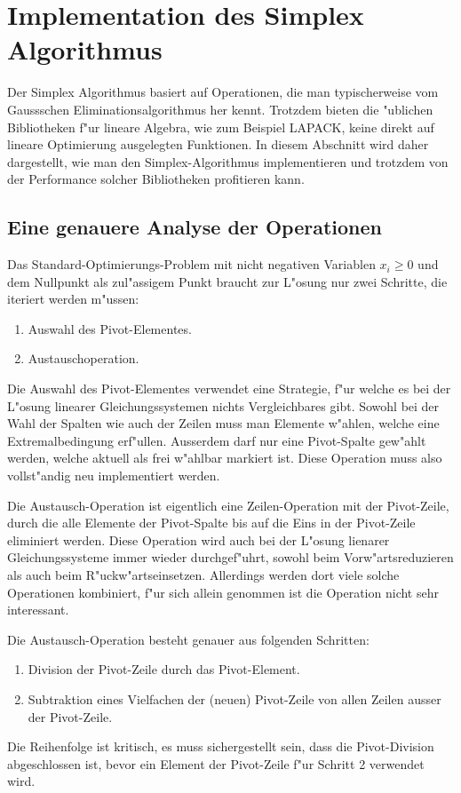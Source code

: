 \chapter{Implementation des Simplex Algorithmus}

Der Simplex Algorithmus basiert auf Operationen, die man typischerweise
vom Gaussschen Eliminationsalgorithmus her kennt.
Trotzdem bieten die "ublichen Bibliotheken f"ur lineare Algebra,
wie zum Beispiel LAPACK, keine direkt auf lineare Optimierung
ausgelegten Funktionen.
In diesem Abschnitt wird daher dargestellt, wie man den Simplex-Algorithmus
implementieren und trotzdem von der Performance solcher
Bibliotheken profitieren kann.

\section{Eine genauere Analyse der Operationen}
Das Standard-Optimierungs-Problem mit nicht negativen Variablen $x_i\ge 0$
und dem Nullpunkt als zul"assigem Punkt braucht zur L"osung nur zwei Schritte,
die iteriert werden m"ussen:
\begin{enumerate}
\item Auswahl des Pivot-Elementes.
\item Austauschoperation.
\end{enumerate}
Die Auswahl des Pivot-Elementes verwendet eine Strategie, f"ur welche es
bei der L"osung linearer Gleichungssystemen nichts Vergleichbares gibt.
Sowohl bei der Wahl der Spalten wie auch der Zeilen muss man Elemente 
w"ahlen, welche eine Extremalbedingung erf"ullen. Ausserdem
darf nur eine Pivot-Spalte gew"ahlt werden, welche aktuell als
frei w"ahlbar markiert ist. Diese Operation muss also vollst"andig neu
implementiert werden.

Die Austausch-Operation ist eigentlich eine Zeilen-Operation mit der
Pivot-Zeile, durch die alle Elemente der Pivot-Spalte bis auf die Eins
in der Pivot-Zeile eliminiert werden. Diese Operation wird auch
bei der L"osung lienarer Gleichungssysteme immer wieder durchgef"uhrt,
sowohl beim Vorw"artsreduzieren als auch beim R"uckw"artseinsetzen.
Allerdings werden dort viele solche Operationen kombiniert, f"ur sich
allein genommen ist die Operation nicht sehr interessant.

Die Austausch-Operation besteht genauer aus folgenden Schritten:
\begin{enumerate}
\item Division der Pivot-Zeile durch das Pivot-Element.
\item Subtraktion eines Vielfachen der (neuen) Pivot-Zeile von allen
Zeilen ausser der Pivot-Zeile.
\end{enumerate}
Die Reihenfolge ist kritisch, es muss sichergestellt sein, dass die
Pivot-Division abgeschlossen ist, bevor ein Element der Pivot-Zeile
f"ur Schritt 2 verwendet wird.

